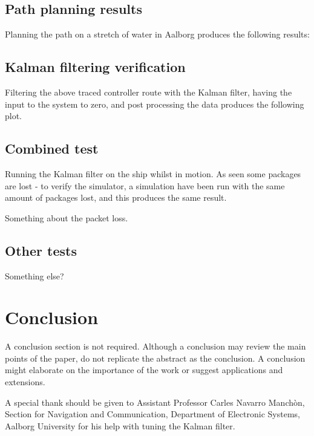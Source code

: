 \documentclass{ifacconf}
\begin{document}
\subsection{Path planning results}
Planning the path on a stretch of water in Aalborg produces the following results:

\subsection{Kalman filtering verification}
Filtering the above traced controller route with the Kalman filter, having the input to the system to zero, and post processing the data produces the following plot.

\subsection{Combined test}
Running the Kalman filter on the ship whilst in motion. As seen some packages are lost - to verify the simulator, a simulation have been run with the same amount of packages lost, and this produces the same result. 

Something about the packet loss. 

\subsection{Other tests}

Something else?


\section{Conclusion}

A conclusion section is not required. Although a conclusion may review the main points of the paper, do not replicate the abstract as the conclusion. A conclusion might elaborate on the importance of the work or suggest applications and extensions. 

\begin{ack}                               %
A special thank should be given to Assistant Professor Carles Navarro Manchòn, Section for Navigation and Communication, Department of Electronic Systems, Aalborg University for his help with tuning the Kalman filter.  %
\end{ack}

%
\end{document}
